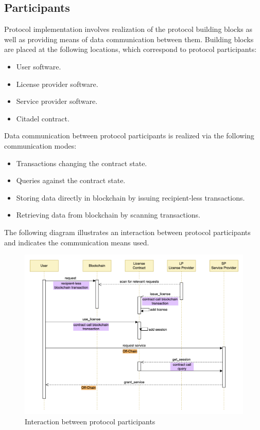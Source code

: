 
\subsection{Participants} 
Protocol implementation involves realization of the protocol building blocks as well as providing means of data communication between them. Building blocks are placed at the following locations, which correspond to protocol participants:

\begin{itemize}%
	\item User software.
	\item License provider software.
	\item Service provider software.
	\item Citadel contract.
\end{itemize}

\begin{flushleft}
Data communication between protocol participants is realized via the following communication modes:
\end{flushleft}

\begin{itemize}%
	\item Transactions changing the contract state.
	\item Queries against the contract state.
	\item Storing data directly in blockchain by issuing recipient-less transactions.
	\item Retrieving data from blockchain by scanning transactions.
\end{itemize}

\begin{flushleft}
The following diagram illustrates an interaction between protocol participants and indicates the communication means used.
\end{flushleft}

\begin{figure}[h]
	\centering
		\includegraphics[width=390pt,draft=false]{images/implementation.png}
	\caption{Interaction between protocol participants}
	\label{fig:implementation}
\end{figure}

